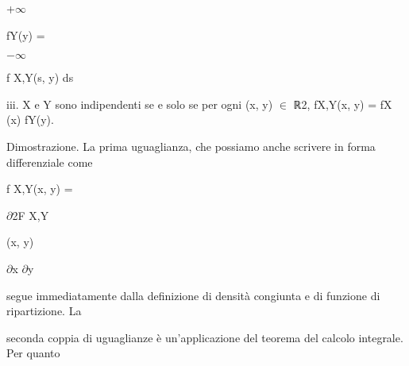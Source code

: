 \documentclass[a4paper,portrait,12pt]{article}
\begin{document}
+$\infty$





\begin{flushleft}
fY(y) =
\end{flushleft}





$-$$\infty$





\begin{flushleft}
f X,Y(s, y) ds
\end{flushleft}





\begin{flushleft}
iii. X e Y sono indipendenti se e solo se per ogni (x, y) $\in$ ℝ2, fX,Y(x, y) = fX (x) fY(y).
\end{flushleft}


\begin{flushleft}
Dimostrazione. La prima uguaglianza, che possiamo anche scrivere in forma differenziale come
\end{flushleft}


\begin{flushleft}
f X,Y(x, y) =
\end{flushleft}





\begin{flushleft}
$\partial$2F X,Y
\end{flushleft}


\begin{flushleft}
(x, y)
\end{flushleft}


\begin{flushleft}
$\partial$x $\partial$y
\end{flushleft}





\begin{flushleft}
segue immediatamente dalla definizione di densit\`{a} congiunta e di funzione di ripartizione. La
\end{flushleft}


\begin{flushleft}
seconda coppia di uguaglianze \`{e} un'applicazione del teorema del calcolo integrale. Per quanto
\end{flushleft}
\end{document}
